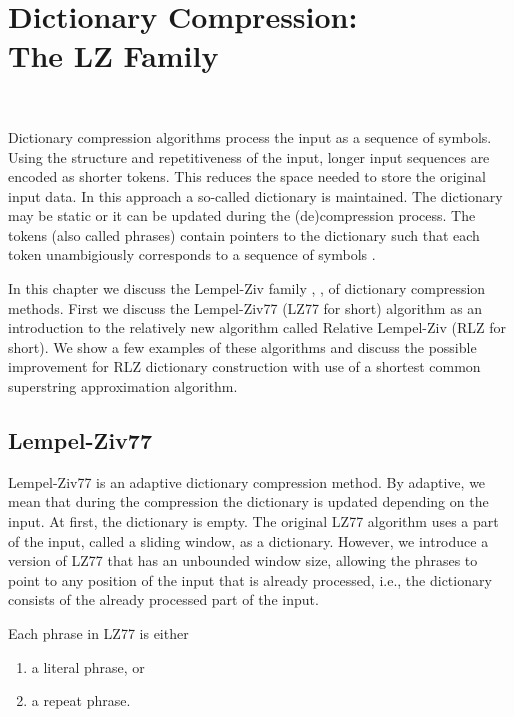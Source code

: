 \documentclass[english,twoside,censored,csm,algorithms-track-2020]{HYthesisML}
\theoremstyle{plain}
\theoremstyle{definition}
\begin{document}
\chapter[Dictionary Compression: The LZ Family]{\texorpdfstring{Dictionary Compression: \\ The LZ Family}{Dictionary Compression: The LZ Family}}~\label{chp-rlz}

Dictionary compression algorithms \citep{Storer82} process the input as a sequence of symbols.
Using the structure and repetitiveness of the input, longer input sequences are encoded as shorter
tokens. This reduces the space needed to store the original input data. In this approach a so-called
dictionary is maintained. The dictionary may be static or it can be updated during the (de)compression process.
The tokens (also called phrases) contain pointers to the dictionary such that each token
unambigiously corresponds to a sequence of symbols \citep{Pu05}.

In this chapter we discuss the Lempel-Ziv family \citep{Ziv77}, \citep{Ziv78}, \citep{Welch84}
 of dictionary compression methods.
First we discuss the Lempel-Ziv77 (LZ77 for short) algorithm
\citep{Ziv77} as an introduction to the relatively new  algorithm called
Relative Lempel-Ziv \citep{Kurppu10} (RLZ for short). We show a few examples of these algorithms and
discuss the possible improvement for RLZ dictionary construction with use of a shortest common
superstring approximation algorithm.

\section{Lempel-Ziv77}

Lempel-Ziv77 is an adaptive dictionary compression method. By adaptive, we mean that during the
compression the dictionary is updated depending on the input. At first, the dictionary is empty. 
The original LZ77 algorithm uses a part of the input, called a sliding window, as a dictionary.
However, we introduce a version of LZ77 that has an unbounded window size, allowing the phrases
to point to any position of the input that is already processed, i.e., the dictionary consists of the
already processed part of the input.

Each phrase in LZ77 is either 
\begin{enumerate}
\item a literal phrase, or
\item a repeat phrase.
\end{enumerate}
\end{document}
